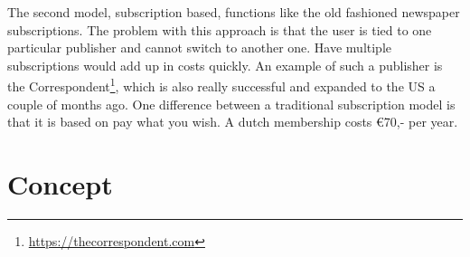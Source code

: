 \documentclass[]{article}
\begin{document}
The second model, subscription based, functions like the old fashioned newspaper subscriptions.  The problem with this approach is that the user is tied to one particular publisher and cannot switch to another one. Have multiple subscriptions would add up in costs quickly. An example of such a publisher is the Correspondent\footnote{\url{https://thecorrespondent.com}}, which is also really successful and expanded to the US a couple of months ago. One difference between a traditional subscription model is that it is based on pay what you wish. A dutch membership costs €70,- per year.








\section {Concept}
\end{document}

